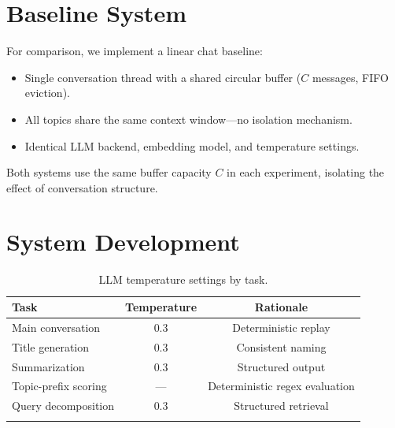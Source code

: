 \section{Baseline System}\label{subsec:baseline}

For comparison, we implement a linear chat baseline:
\begin{itemize}
    \item Single conversation thread with a shared circular buffer ($C$ messages, FIFO eviction).
    \item All topics share the same context window---no isolation mechanism.
    \item Identical LLM backend, embedding model, and temperature settings.
\end{itemize}
Both systems use the same buffer capacity $C$ in each experiment, isolating the effect of conversation structure.

\section{System Development}


\begin{table}[htbp]
\caption{LLM temperature settings by task.}\label{tab:temps}
\begin{tabular*}{\textwidth}{@{\extracolsep\fill}lcc@{}}
\toprule
\textbf{Task} & \textbf{Temperature} & \textbf{Rationale} \\
\midrule
Main conversation  & 0.3 & Deterministic replay \\
Title generation   & 0.3 & Consistent naming \\
Summarization      & 0.3 & Structured output \\
Topic-prefix scoring & --- & Deterministic regex evaluation \\
Query decomposition & 0.3 & Structured retrieval \\
\botrule
\end{tabular*}
\end{table}


